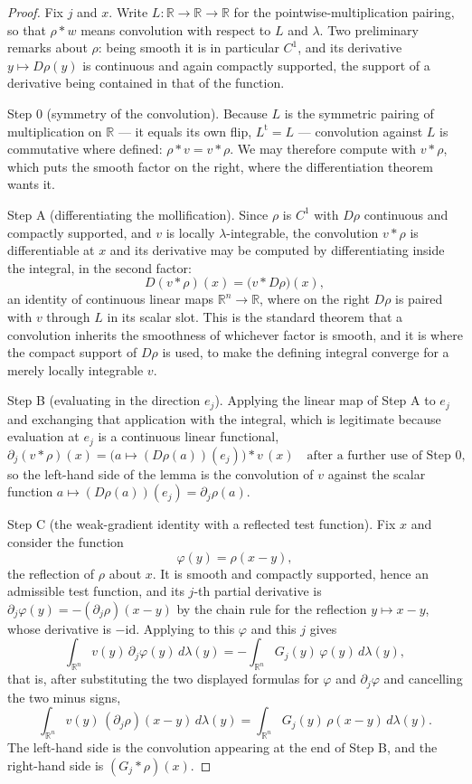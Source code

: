 \begin{proof}
Fix $j$ and $x$.  Write $L : \mathbb{R} \to \mathbb{R} \to \mathbb{R}$ for the
pointwise-multiplication pairing, so that $\rho * w$ means convolution with
respect to $L$ and $\lambda$.  Two preliminary remarks about $\rho$: being
smooth it is in particular $C^1$, and its derivative $y \mapsto D\rho(y)$ is
continuous and again compactly supported, the support of a derivative being
contained in that of the function.

Step 0 (symmetry of the convolution).  Because $L$ is the symmetric pairing of
multiplication on $\mathbb{R}$ --- it equals its own flip, $L^{\mathrm{t}} = L$
--- convolution against $L$ is commutative where defined:
$\rho * v = v * \rho$.  We may therefore compute with $v * \rho$, which puts the
smooth factor on the right, where the differentiation theorem wants it.

Step A (differentiating the mollification).  Since $\rho$ is $C^1$ with
$D\rho$ continuous and compactly supported, and $v$ is locally
$\lambda$-integrable, the convolution $v * \rho$ is differentiable at $x$ and
its derivative may be computed by differentiating inside the integral, in the
second factor:
\[
  D(v * \rho)(x) = \bigl(v * D\rho\bigr)(x) ,
\]
an identity of continuous linear maps $\mathbb{R}^n \to \mathbb{R}$, where on the
right $D\rho$ is paired with $v$ through $L$ in its scalar slot.  This is the
standard theorem that a convolution inherits the smoothness of whichever factor
is smooth, and it is where the compact support of $D\rho$ is used, to make the
defining integral converge for a merely locally integrable $v$.

Step B (evaluating in the direction $e_j$).  Applying the linear map of Step A
to $e_j$ and exchanging that application with the integral, which is legitimate
because evaluation at $e_j$ is a continuous linear functional,
\[
  \partial_j (v * \rho)(x)
    = \bigl( a \mapsto (D\rho(a))(e_j) \bigr) * v \, (x)
      \quad\text{after a further use of Step 0,}
\]
so the left-hand side of the lemma is the convolution of $v$ against the scalar
function $a \mapsto (D\rho(a))(e_j) = \partial_j \rho(a)$.

Step C (the weak-gradient identity with a reflected test function).  Fix $x$ and
consider the function
\[
  \varphi(y) = \rho(x - y) ,
\]
the reflection of $\rho$ about $x$.  It is smooth and compactly supported, hence
an admissible test function, and its $j$-th partial derivative is
$\partial_j \varphi(y) = -(\partial_j \rho)(x-y)$ by the chain rule for the
reflection $y \mapsto x-y$, whose derivative is $-\mathrm{id}$.  Applying
 to this $\varphi$ and this $j$ gives
\[
  \int_{\mathbb{R}^n} v(y)\, \partial_j\varphi(y)\, d\lambda(y)
    = -\int_{\mathbb{R}^n} G_j(y)\, \varphi(y)\, d\lambda(y),
\]
that is, after substituting the two displayed formulas for $\varphi$ and
$\partial_j \varphi$ and cancelling the two minus signs,
\[
  \int_{\mathbb{R}^n} v(y)\, (\partial_j\rho)(x-y)\, d\lambda(y)
    = \int_{\mathbb{R}^n} G_j(y)\, \rho(x-y)\, d\lambda(y) .
\]
The left-hand side is the convolution appearing at the end of Step B, and the
right-hand side is $(G_j * \rho)(x)$.


\end{proof}
